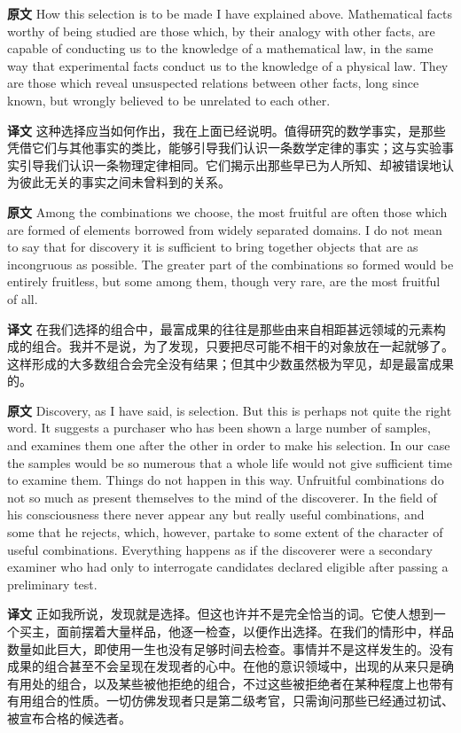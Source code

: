 \documentclass[UTF8]{ctexart}
\newenvironment{english}{\par\small\noindent\textbf{原文}\quad\ignorespaces}{\par}
\newenvironment{zhtranslation}{\par\noindent\textbf{译文}\quad\ignorespaces}{\par\vspace{0.35em}}
\begin{document}
\begin{english}
How this selection is to be made I have explained above. Mathematical facts worthy of being studied are those which, by their analogy with other facts, are capable of conducting us to the knowledge of a mathematical law, in the same way that experimental facts conduct us to the knowledge of a physical law. They are those which reveal unsuspected relations between other facts, long since known, but wrongly believed to be unrelated to each other.
\end{english}
\begin{zhtranslation}
这种选择应当如何作出，我在上面已经说明。值得研究的数学事实，是那些凭借它们与其他事实的类比，能够引导我们认识一条数学定律的事实；这与实验事实引导我们认识一条物理定律相同。它们揭示出那些早已为人所知、却被错误地认为彼此无关的事实之间未曾料到的关系。\end{zhtranslation}

\begin{english}
Among the combinations we choose, the most fruitful are often those which are formed of elements borrowed from widely separated domains. I do not mean to say that for discovery it is sufficient to bring together objects that are as incongruous as possible. The greater part of the combinations so formed would be entirely fruitless, but some among them, though very rare, are the most fruitful of all.
\end{english}
\begin{zhtranslation}
在我们选择的组合中，最富成果的往往是那些由来自相距甚远领域的元素构成的组合。我并不是说，为了发现，只要把尽可能不相干的对象放在一起就够了。这样形成的大多数组合会完全没有结果；但其中少数虽然极为罕见，却是最富成果的。\end{zhtranslation}

\begin{english}
Discovery, as I have said, is selection. But this is perhaps not quite the right word. It suggests a purchaser who has been shown a large number of samples, and examines them one after the other in order to make his selection. In our case the samples would be so numerous that a whole life would not give sufficient time to examine them. Things do not happen in this way. Unfruitful combinations do not so much as present themselves to the mind of the discoverer. In the field of his consciousness there never appear any but really useful combinations, and some that he rejects, which, however, partake to some extent of the character of useful combinations. Everything happens as if the discoverer were a secondary examiner who had only to interrogate candidates declared eligible after passing a preliminary test.
\end{english}
\begin{zhtranslation}
正如我所说，发现就是选择。但这也许并不是完全恰当的词。它使人想到一个买主，面前摆着大量样品，他逐一检查，以便作出选择。在我们的情形中，样品数量如此巨大，即使用一生也没有足够时间去检查。事情并不是这样发生的。没有成果的组合甚至不会呈现在发现者的心中。在他的意识领域中，出现的从来只是确有用处的组合，以及某些被他拒绝的组合，不过这些被拒绝者在某种程度上也带有有用组合的性质。一切仿佛发现者只是第二级考官，只需询问那些已经通过初试、被宣布合格的候选者。\end{zhtranslation}
\end{document}
